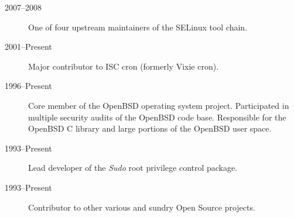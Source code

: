 
\begin{description}
\item[2007--2008] One of four upstream maintainers of the SELinux tool chain.
\item[2001--Present] Major contributor to ISC cron (formerly Vixie cron).
\item[1996--Present] Core member of the OpenBSD operating system project.  Participated in multiple security audits of the OpenBSD code base.  Responsible for the OpenBSD C library and large portions of the OpenBSD user space.
\item[1993--Present] Lead developer of the \emph{Sudo} root privilege control package.
\item[1993--Present] Contributor to other various and sundry Open Source projects.
\end{description}

\pagebreak







